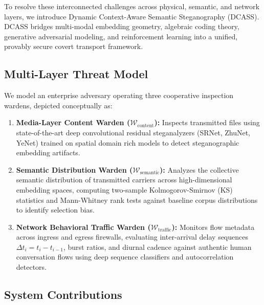 \documentclass[conference]{IEEEtran}
\begin{document}
To resolve these interconnected challenges across physical, semantic, and network layers, we introduce Dynamic Context-Aware Semantic Steganography (DCASS). DCASS bridges multi-modal embedding geometry, algebraic coding theory, generative adversarial modeling, and reinforcement learning into a unified, provably secure covert transport framework.

\subsection{Multi-Layer Threat Model}

We model an enterprise adversary operating three cooperative inspection wardens, depicted conceptually as:
\begin{enumerate}
    \item \textbf{Media-Layer Content Warden ($\mathcal{W}_{\text{content}}$):} Inspects transmitted files using state-of-the-art deep convolutional residual steganalyzers (SRNet, ZhuNet, YeNet) trained on spatial domain rich models to detect steganographic embedding artifacts.
    \item \textbf{Semantic Distribution Warden ($\mathcal{W}_{\text{semantic}}$):} Analyzes the collective semantic distribution of transmitted carriers across high-dimensional embedding spaces, computing two-sample Kolmogorov-Smirnov (KS) statistics and Mann-Whitney rank tests against baseline corpus distributions to identify selection bias.
    \item \textbf{Network Behavioral Traffic Warden ($\mathcal{W}_{\text{traffic}}$):} Monitors flow metadata across ingress and egress firewalls, evaluating inter-arrival delay sequences $\Delta t_i = t_i - t_{i-1}$, burst ratios, and diurnal cadence against authentic human conversation flows using deep sequence classifiers and autocorrelation detectors.
\end{enumerate}

\subsection{System Contributions}
\end{document}
